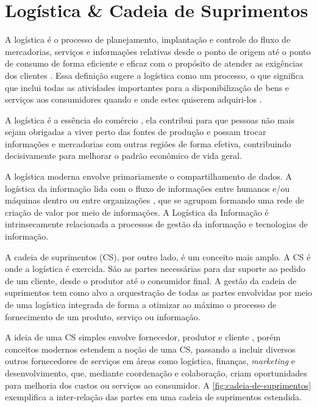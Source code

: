 \section{Logística \& Cadeia de Suprimentos}
\label{sec:logistica}

A logística é o processo de planejamento, implantação e controle do fluxo de mercadorias, serviços e informações relativas desde o ponto de origem até o ponto de consumo de forma eficiente e eficaz com o propósito de atender as exigências dos clientes \cite{cscmp2013supplychainglossary}. Essa definição sugere a logística como um processo, o que significa que inclui todas as atividades importantes para a disponibilização de bens e serviços aos consumidores quando e onde estes quiserem adquiri-los \cite{ballou2006cadeiasuprimentos}.

A logística é a essência do comércio \cite{ballou2006cadeiasuprimentos}, ela contribui para que pessoas não mais sejam obrigadas a viver perto das fontes de produção e possam trocar informações e mercadorias com outras regiões de forma efetiva, contribuindo decisivamente para melhorar o padrão econômico de vida geral.

A logística moderna envolve primariamente o compartilhamento de dados. A logística da informação lida com o fluxo de informações entre humanos e/ou máquinas dentro ou entre organizações \cite{haftor2009information}, que se agrupam formando uma rede de criação de valor por meio de informações. A Logística da Informação é intrinsecamente relacionada a processos de gestão da informação e tecnologias de informação.

A cadeia de suprimentos (CS), por outro lado, é um conceito mais amplo. A CS é onde a logística é exercida. São as partes necessárias para dar suporte ao pedido de um cliente, desde o produtor até o consumidor final. A gestão da cadeia de suprimentos tem como alvo a orquestração de todas as partes envolvidas por meio de uma logística integrada de forma a otimizar ao máximo o processo de fornecimento de um produto, serviço ou informação.

A ideia de uma CS simples envolve fornecedor, produtor e cliente \cite{hugos2018supplychain}, porém conceitos modernos estendem a noção de uma CS, passando a incluir diversos outros fornecedores de serviços em áreas como logística, finanças, \textit{marketing} e desenvolvimento, que, mediante coordenação e colaboração, criam oportunidades para melhoria dos custos ou serviços ao consumidor. A \autoref{fig:cadeia-de-suprimentos} exemplifica a inter-relação das partes em uma cadeia de suprimentos estendida.

